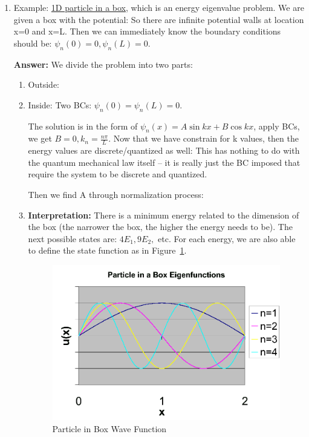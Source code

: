 \documentclass{school-22.101-notes}
\begin{document}
\begin{enumerate}
\item Example: \uline{1D particle in a box,} which is an energy eigenvalue problem. We are given a box with the potential:
  So there are infinite potential walls at location x=0 and x=L. Then we can immediately know the boundary conditions should be: $\psi_n (0) = 0, \psi_n(L) = 0$. 

  \textbf{Answer:} We divide the problem into two parts:
  \begin{enumerate}
  \item Outside: 
  \item Inside: 
    Two BCs: $\psi_n (0) = \psi_n(L) =0$. 
    
    The solution is in the form of $\psi_n (x) = A \sin kx + B \cos kx$, apply BCs, we get $B=0, k_n = \frac{n \pi}{L} $. Now that we have constrain for k values, then the energy values are discrete/quantized as well: 
    This has nothing to do with the quantum mechanical law itself -- it is really just the BC imposed that require the system to be discrete and quantized. 
    
    Then we find A through normalization process:
    
  
  \item \textbf{Interpretation:} There is a minimum energy related to the dimension of the box (the narrower the box, the higher the energy needs to be). The next possible states are: $4E_1, 9E_2,$ etc. For each energy, we are also able to define the state function as in Figure~\ref{particle-in-box}.
  \begin{figure}
    \centering
    \includegraphics[width=4in]{images/qm/1Dparticle-in-box.png}
    \caption{Particle in Box Wave Function\label{particle-in-box}}
  \end{figure}

  \end{enumerate}
\end{enumerate}

\end{document}

